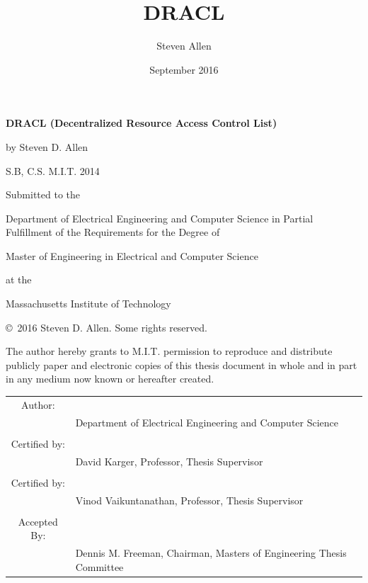 \documentclass[pdftex,12pt,a4papaer,twoside,notitlepage]{report}
\title{DRACL}
\author{Steven Allen}
\date{September 2016}
\begin{document}
\makeatletter
\def\footnoterule{\kern 12\p@
  \hrule \@width 2in \kern 7.6\p@} %
\makeatother


\begin{titlingpage}

  \begin{singlespacing}

    \setlength{\parskip}{1em}
    \begin{center}

      \textbf{DRACL (Decentralized Resource Access Control List)}

      by Steven D. Allen

      S.B, C.S. M.I.T. 2014

      \vspace{2em}

      Submitted to the

      Department of Electrical Engineering and Computer Science in
      Partial Fulfillment of the Requirements for the Degree of

      Master of Engineering in Electrical and Computer Science

      at the

      Massachusetts Institute of Technology

      \thedate

      \copyright~2016 Steven D. Allen. Some rights reserved.

      The author hereby grants to M.I.T. permission to reproduce and distribute
      publicly paper and electronic copies of this thesis document in whole and in
      part in any medium now known or hereafter created.

      \vspace{3em}
      \begin{tabular}{c l}
        Author: & \hrulefill \\
                & {\small Department of Electrical Engineering and Computer Science } \\
        \\
        Certified by: & \hrulefill \\
                & {\small David Karger, Professor, Thesis Supervisor } \\
        \\
        Certified by: & \hrulefill \\
                & {\small Vinod Vaikuntanathan, Professor, Thesis Supervisor } \\
        \\
        Accepted By: & \hrulefill \\
                & {\small Dennis M. Freeman, Chairman, Masters of Engineering Thesis Committee } \\
      \end{tabular}
    \end{center}

  \end{singlespacing}

\end{titlingpage}
\end{document}
